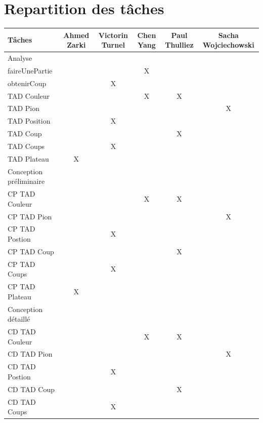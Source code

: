 \documentclass{article}
\begin{document}
\section{Repartition des tâches}
\begin{tabular}{|l|c|c|c|c|c|}
  \hline
  Tâches & Ahmed Zarki & Victorin Turnel & Chen Yang & Paul Thulliez & Sacha Wojciechowski \\
  \hline
  Analyse \\
  \hline
  faireUnePartie & & & X & & \\
  obtenirCoup & & X & & & \\
  TAD Couleur  & & & X & X &   \\
  TAD Pion & & & & & X \\
  TAD Position & & X & & &   \\
  TAD Coup & & & & X & \\
  TAD Coups & & X  & & &  \\
  TAD Plateau & X & & & & \\
  \hline
  Conception préliminaire \\
  \hline
  CP TAD Couleur & & & X & X & \\
  CP TAD Pion & & & & & X \\
  CP TAD Postion & & X & & &  \\
  CP TAD Coup & & & & X & \\              
  CP TAD Coups & & X & & & \\             
  CP TAD Plateau & X & & & & \\
  \hline
  Conception détaillé \\
  \hline
  CD TAD Couleur & & & X & X & \\                                                                                                                                                                       
  CD TAD Pion & & & & & X \\                                                                                   
  CD TAD Postion & & X & & &  \\                                                                                                                                                                         
  CD TAD Coup & & & & X & \\                                                                                                                                                                             
  CD TAD Coups & & X & & & \\                                                                                                                                                                            

\end{tabular}
\end{document}
